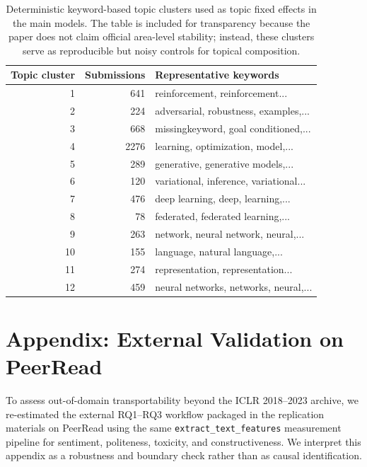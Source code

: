 \begin{table}[!htbp]
\centering
\begingroup
\normalsize
\renewcommand{\arraystretch}{1.20}
\setlength{\tabcolsep}{6pt}
\caption{Deterministic keyword-based topic clusters used as topic fixed effects in the main models. The table is included for transparency because the paper does not claim official area-level stability; instead, these clusters serve as reproducible but noisy controls for topical composition.}
\label{tab:app:topics}
\begin{tabular}{rrl}
\toprule
Topic cluster & Submissions & Representative keywords \\
\midrule
1 & 641 & reinforcement, reinforcement... \\
2 & 224 & adversarial, robustness, examples,... \\
3 & 668 & missingkeyword, goal conditioned,... \\
4 & 2276 & learning, optimization, model,... \\
5 & 289 & generative, generative models,... \\
6 & 120 & variational, inference, variational... \\
7 & 476 & deep learning, deep, learning,... \\
8 & 78 & federated, federated learning,... \\
9 & 263 & network, neural network, neural,... \\
10 & 155 & language, natural language,... \\
11 & 274 & representation, representation... \\
12 & 459 & neural networks, networks, neural,... \\
\bottomrule
\end{tabular}
\endgroup
\end{table}

\FloatBarrier
\vspace{0.6em}
\section*{Appendix: External Validation on PeerRead}
To assess out-of-domain transportability beyond the ICLR 2018--2023 archive, we re-estimated the external RQ1--RQ3 workflow packaged in the replication materials on PeerRead using the same \texttt{extract\_text\_features} measurement pipeline for sentiment, politeness, toxicity, and constructiveness. We interpret this appendix as a robustness and boundary check rather than as causal identification.

